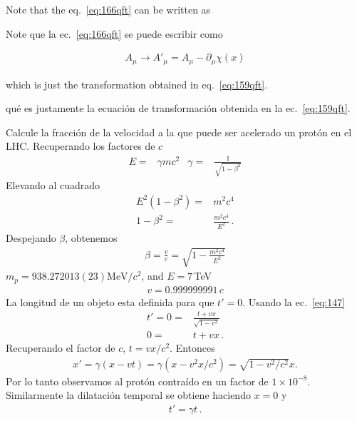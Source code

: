 \begin{english}
Note that the eq.~\eqref{eq:166qft} can be written as  
\end{english}
\begin{spanish}
Note que la ec.~\eqref{eq:166qft} se puede escribir como
\end{spanish}

\begin{align}
\label{eq:168qft}
  A_\mu\to A'_\mu=A_\mu-\partial_\mu\chi(x)
\end{align}
\begin{english}
which is just the transformation obtained in eq.~\eqref{eq:159qft}.  
\end{english}
\begin{spanish} %
qu\'e es justamente la ecuaci\'on de transformaci\'on obtenida en la ec.~\eqref{eq:159qft}.  
\end{spanish}

\begin{frame}
\begin{example}
  Calcule la fracci\'on de la velocidad a la que puede ser acelerado un prot\'on en el LHC.
Recuperando los factores de $c$
  \begin{align*}
  E=&\gamma m c^2&  \gamma=&\frac{1}{\sqrt{1-\beta^2}}
\end{align*}
Elevando al cuadrado
\begin{align}
  E^2(1-\beta^2)=&m^2c^4 \nonumber\\
1-\beta^2=&\frac{m^2c^4}{E^2}\,.
\end{align}
Despejando $\beta$, obtenemos
\begin{align*}
  \beta=\frac{v}{c}=\sqrt{1-\frac{m^2 c^4}{E^2}}
\end{align*}
$m_p=938.272013(23) {\text{MeV}}/{c^2}$, and $E=7\,$TeV
\begin{align*}
  v=0.999999991\,c
\end{align*}
La longitud de un objeto esta definida para que $t'=0$. Usando la ec.~\eqref{eq:147} 
\begin{align}
  t'=0=&\frac{t+vx}{\sqrt{1-v^2}} \nonumber\\
     0=&t+vx\,.
\end{align}
Recuperando el factor de $c$,
 $t=v x/c^2$. Entonces
\begin{align}
  x'=\gamma(x-v t)=\gamma(x-v^2 x/c^2)=\sqrt{1-v^2/c^2}x.
\end{align}
Por lo tanto observamos al protón contraído en un factor de $1\times10^{-8}$.  Similarmente la dilataci\'on temporal se obtiene haciendo $x=0$ y
\begin{align}
  t'=\gamma t\,.
\end{align}
\end{example}

\end{frame}

